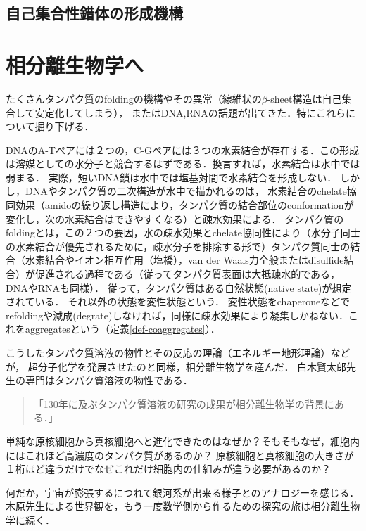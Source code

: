 \documentclass[uplatex, dvipdfmx]{jsreport}
\begin{document}
\subsection{自己集合性錯体の形成機構}

\section{相分離生物学へ}

たくさんタンパク質のfoldingの機構やその異常（線維状の$\beta$-sheet構造は自己集合して安定化してしまう），
またはDNA,RNAの話題が出てきた．特にこれらについて掘り下げる．

DNAのA-Tペアには２つの，C-Gペアには３つの水素結合が存在する．この形成は溶媒としての水分子と競合するはずである．換言すれば，水素結合は水中では弱まる．
実際，短いDNA鎖は水中では塩基対間で水素結合を形成しない．
しかし，DNAやタンパク質の二次構造が水中で描かれるのは，
水素結合のchelate協同効果（amidoの繰り返し構造により，タンパク質の結合部位のconformationが変化し，次の水素結合はできやすくなる）と疎水効果による．
タンパク質のfoldingとは，この２つの要因，水の疎水効果とchelate協同性により（水分子同士の水素結合が優先されるために，疎水分子を排除する形で）タンパク質同士の結合（水素結合やイオン相互作用（塩橋），van der Waals力全般またはdisulfide結合）が促進される過程である（従ってタンパク質表面は大抵疎水的である，DNAやRNAも同様）．
従って，タンパク質はある自然状態(native state)が想定されている．
それ以外の状態を変性状態という．
変性状態をchaperoneなどでrefoldingや減成(degrate)しなければ，同様に疎水効果により凝集しかねない．これをaggregatesという（定義\ref{def-coaggregates}）．

こうしたタンパク質溶液の物性とその反応の理論（エネルギー地形理論）などが，
超分子化学を発展させたのと同様，相分離生物学を産んだ．
白木賢太郎先生の専門はタンパク質溶液の物性である．
\begin{quote}
    「130年に及ぶタンパク質溶液の研究の成果が相分離生物学の背景にある．」\cite{白木賢太郎}
\end{quote}

\begin{screen}
    単純な原核細胞から真核細胞へと進化できたのはなぜか？そもそもなぜ，細胞内にはこれほど高濃度のタンパク質があるのか？
    原核細胞と真核細胞の大きさが１桁ほど違うだけでなぜこれだけ細胞内の仕組みが違う必要があるのか？

    何だか，宇宙が膨張するにつれて銀河系が出来る様子とのアナロジーを感じる．
    木原先生による世界観を，もう一度数学側から作るための探究の旅は相分離生物学に続く．
\end{screen}
\end{document}
